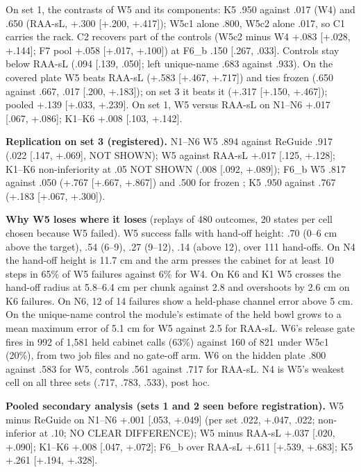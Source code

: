 On set 1, the contrasts of W5 and its components: K5 .950 against .017 (W4) and .650 (RAA-sL, +.300 [+.200, +.417]); W5c1 alone .800, W5c2 alone .017, so C1 carries the rack. C2 recovers part of the controls (W5c2 minus W4 +.083 [+.028, +.144]; F7 pool +.058 [+.017, +.100]) at F6\_b \mi.150 [\mi.267, \mi.033]. Controls stay below RAA-sL (\mi.094 [\mi.139, \mi.050]; left unique-name .683 against .933). On the covered plate W5 beats RAA-sL (+.583 [+.467, +.717]) and ties frozen \pifive{} (.650 against .667, \mi.017 [\mi.200, +.183]); on set 3 it beats it (+.317 [+.150, +.467]); pooled +.139 [+.033, +.239]. On set 1, W5 versus RAA-sL on N1--N6 +.017 [\mi.067, +.086]; K1--K6 +.008 [\mi.103, +.142].

\textbf{Replication on set 3 (registered).} N1--N6 W5 .894 against ReGuide .917 (\mi.022 [\mi.147, +.069], NOT SHOWN); W5 against RAA-sL +.017 [\mi.125, +.128]; K1--K6 non-inferiority at \mi.05 NOT SHOWN (\mi.008 [\mi.092, +.089]); F6\_b W5 .817 against .050 (+.767 [+.667, +.867]) and .500 for frozen \pifive; K5 .950 against .767 (+.183 [+.067, +.300]).

\textbf{Why W5 loses where it loses} (replays of 480 outcomes, 20 states per cell chosen because W5 failed). W5 success falls with hand-off height: .70 (0--6 cm above the target), .54 (6--9), .27 (9--12), .14 (above 12), over 111 hand-offs. On N4 the hand-off height is 11.7 cm and the arm presses the cabinet for at least 10 steps in 65\% of W5 failures against 6\% for W4. On K6 and K1 W5 crosses the hand-off radius at 5.8--6.4 cm per chunk against 2.8 and overshoots by 2.6 cm on K6 failures. On N6, 12 of 14 failures show a held-phase channel error above 5 cm. On the unique-name control the module's estimate of the held bowl grows to a mean maximum error of 5.1 cm for W5 against 2.5 for RAA-sL. W6's release gate fires in 992 of 1,581 held cabinet calls (63\%) against 160 of 821 under W5c1 (20\%), from two job files and no gate-off arm. W6 on the hidden plate .800 against .583 for W5, controls .561 against .717 for RAA-sL. N4 is W5's weakest cell on all three sets (.717, .783, .533), post hoc.

\textbf{Pooled secondary analysis (sets 1 and 2 seen before registration).} W5 minus ReGuide on N1--N6 +.001 [\mi.053, +.049] (per set \mi.022, +.047, \mi.022; non-inferior at \mi.10; NO CLEAR DIFFERENCE); W5 minus RAA-sL +.037 [\mi.020, +.090]; K1--K6 +.008 [\mi.047, +.072]; F6\_b over RAA-sL +.611 [+.539, +.683]; K5 +.261 [+.194, +.328].

